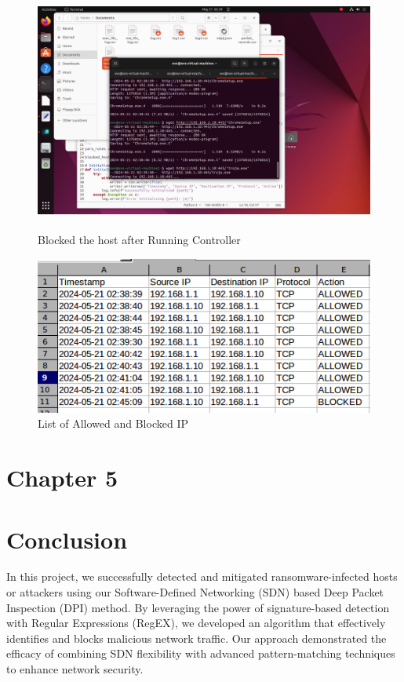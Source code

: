 \documentclass[12pt,letterpaper]{article}
\begin{document}
\begin{figure}[htbp]
    \centering
    \includegraphics[width=\textwidth, height=8cm]{images/Screenshot 2024-05-21 at 02.39.47.png}
    \caption{Blocked the host after Running Controller}
    \label{fig:Blocked the host after Running Controller}
\end{figure}

\clearpage

\begin{figure}[htbp]
    \centering
    \includegraphics{images/Screenshot 2024-05-21 at 17.59.39.png}
    \caption{List of Allowed and Blocked IP}
    \label{fig:List of Allowed and Blocked IP}
\end{figure}


\clearpage
    \newpage
    \section*{Chapter 5}
        \section{Conclusion}

            In this project, we successfully detected and mitigated ransomware-infected hosts or attackers using our Software-Defined Networking (SDN) based Deep Packet Inspection (DPI) method. By leveraging the power of signature-based detection with Regular Expressions (RegEX), we developed an algorithm that effectively identifies and blocks malicious network traffic. Our approach demonstrated the efficacy of combining SDN flexibility with advanced pattern-matching techniques to enhance network security.
\end{document}
